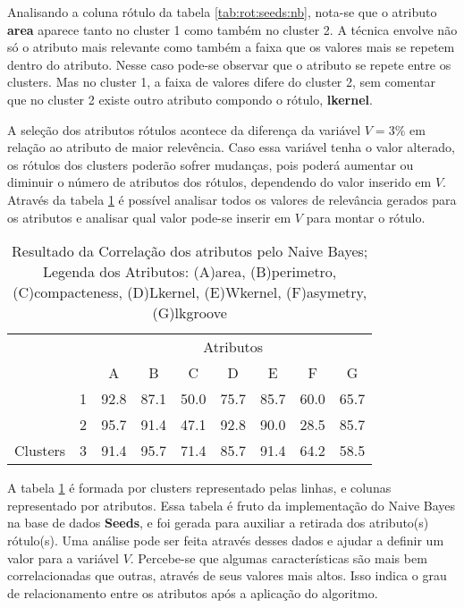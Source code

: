 Analisando a coluna rótulo da tabela \ref{tab:rot:seeds:nb}, nota-se que o atributo \textbf{area} aparece tanto no  cluster 1 como também no cluster 2. A técnica envolve não só o atributo mais relevante como também a faixa que os valores mais se repetem dentro do atributo. Nesse caso pode-se observar que o atributo se repete entre os clusters. Mas no cluster 1, a faixa de valores difere do cluster 2, sem comentar que no cluster 2 existe outro atributo compondo o rótulo, \textbf{lkernel}.


A seleção dos atributos rótulos acontece da diferença da variável ${V=3\%}$ em relação ao atributo de maior relevência. Caso essa variável tenha o valor alterado, os rótulos dos clusters poderão sofrer mudanças, pois poderá aumentar  ou diminuir o número de atributos dos rótulos, dependendo do valor inserido em ${V}$. Através da tabela \ref{tab:matrelevancia:seeds:nb} é possível analisar todos os valores de relevância gerados para os atributos e analisar qual valor pode-se inserir em ${V}$ para montar o rótulo.

\begin{table}[!h]
    
    \caption{Resultado da Correlação dos atributos pelo Naive Bayes; Legenda dos Atributos: (A)area, (B)perimetro, (C)compacteness, (D)Lkernel, (E)Wkernel, (F)asymetry, (G)lkgroove}    
    \centering
   \small\addtolength{\tabcolsep}{+2pt}
    \begin{tabular}{|cl|c|c|c|c|c|c|c|}
        \hline \hline
                                &   & \multicolumn{7}{c|}{Atributos}          \\ \cline{3-9} 
        \multicolumn{1}{|l}{}                            &   & A    & B & C & D & E & F & G \\ \hline
        \multicolumn{1}{|c|}{}                           & 1 & 92.8 & 87.1   & 50.0      & 75.7 & 85.7 & 60.0   & 65.7   \\ \cline{2-9} 
        \multicolumn{1}{|c|}{}                           & 2 & 95.7 & 91.4   & 47.1      & 92.8 & 90.0 & 28.5  & 85.7  \\ \cline{2-9} 
        \multicolumn{1}{|c|}{\multirow{-3}{*}{Clusters}} & 3 & 91.4 & 95.7   & 71.4      & 85.7 & 91.4 & 64.2  & 58.5  \\ \hline
    \end{tabular}
    \label{tab:matrelevancia:seeds:nb} 
\end{table}

A tabela \ref{tab:matrelevancia:seeds:nb} é formada por clusters representado pelas linhas, e colunas representado por atributos. Essa tabela é fruto da implementação do Naive Bayes na base de dados \textbf{Seeds}, e foi  gerada para auxiliar a retirada dos atributo(s) rótulo(s). Uma análise pode ser feita através desses dados e ajudar a definir um valor para a variável ${V}$. Percebe-se que algumas características são mais bem correlacionadas que  outras, através de seus valores mais altos. Isso indica o grau de relacionamento entre os atributos após a aplicação do algoritmo. 


